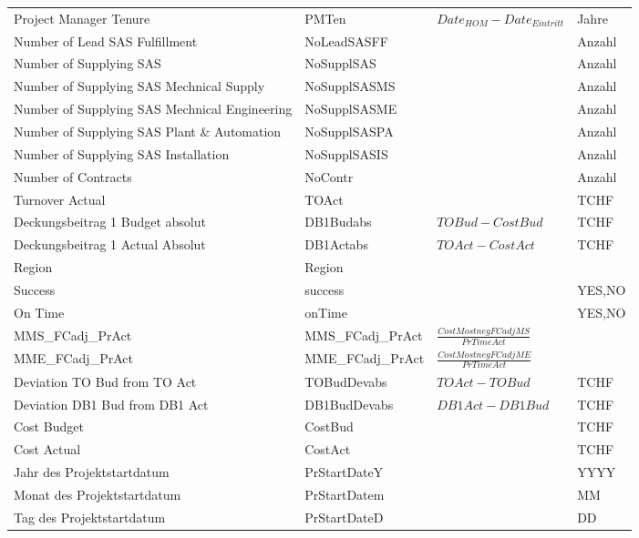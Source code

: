 \begin{landscape}
\begin{center}
\begin{longtable}{p{6cm}|p{4cm}|p{6cm}|p{3cm}}
		Project Manager Tenure & PMTen & $Date_{HOM}-Date_{Eintritt}$ & \multicolumn{1}{l}{Jahre} \\
		Number of Lead SAS Fulfillment & NoLeadSASFF &       & \multicolumn{1}{l}{Anzahl} \\
		Number of Supplying SAS & NoSupplSAS &       & \multicolumn{1}{l}{Anzahl} \\
		Number of Supplying SAS Mechnical Supply & NoSupplSASMS &       & \multicolumn{1}{l}{Anzahl} \\
		Number of Supplying SAS Mechnical Engineering & NoSupplSASME &       & \multicolumn{1}{l}{Anzahl} \\
		Number of Supplying SAS Plant \& Automation & NoSupplSASPA &       & \multicolumn{1}{l}{Anzahl} \\
		Number of Supplying SAS Installation & NoSupplSASIS &       & \multicolumn{1}{l}{Anzahl} \\
		Number of Contracts & NoContr &       & \multicolumn{1}{l}{Anzahl} \\
		Turnover Actual & TOAct &       & \multicolumn{1}{l}{TCHF} \\
		Deckungsbeitrag 1 Budget absolut & DB1Budabs & $TOBud-CostBud$ & \multicolumn{1}{l}{TCHF} \\
		Deckungsbeitrag 1 Actual Absolut & DB1Actabs & $TOAct-CostAct$ & \multicolumn{1}{l}{TCHF} \\
		Region & Region &       &  \\
		Success & success &       & {YES,NO} \\
		On Time & onTime &       & {YES,NO} \\
		MMS\_FCadj\_PrAct & MMS\_FCadj\_PrAct & $\frac{CostMostnegFCadjMS}{PrTimeAct}$ & \\
		MME\_FCadj\_PrAct & MME\_FCadj\_PrAct & $\frac{CostMostnegFCadjME}{PrTimeAct}$ &  \\
		Deviation TO Bud from TO Act & TOBudDevabs & $TOAct-TOBud$ & TCHF \\
		Deviation DB1 Bud from DB1 Act & DB1BudDevabs & $DB1Act-DB1Bud$ & TCHF \\
		Cost Budget & CostBud &       & TCHF \\
		Cost Actual & CostAct &       & TCHF \\
		Jahr des Projektstartdatum & PrStartDateY &       & YYYY \\
		Monat des Projektstartdatum & PrStartDatem &       & MM \\
		Tag des Projektstartdatum & PrStartDateD &       & DD \\

\end{longtable}
\end{center}
\end{landscape}

